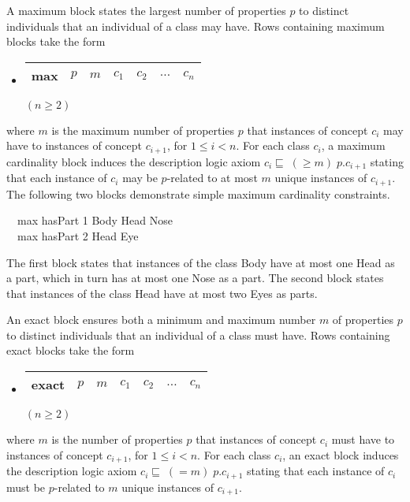 \documentclass[preprint,number]{elsarticle}
\begin{document}
A maximum block states the largest number of properties $p$ to
distinct individuals that an individual of a class may have.  Rows
containing maximum blocks take the form
\begin{itemize}
\item[]
  \begin{tabular}{|l|l|l|l|l|l|l|}\hline \textsf{max} & $p$ & $m$ & 
    $c_1$ & $c_2$ & $\dots$ & $c_n$
    \\ \hline
  \end{tabular} \hfill $(n \ge 2)$
\end{itemize}
where $m$ is the maximum number of properties $p$ that instances of
concept $c_i$ may have to instances of concept $c_{i+1}$, for $1 \le i
< n$.  For each class $c_i$, a maximum cardinality block induces the
description logic axiom $c_i \sqsubseteq \; (\ge m) \; p.c_{i+1}$
stating that each instance of $c_i$ may be $p$-related to at most $m$
unique instances of $c_{i+1}$. The following two blocks demonstrate
simple maximum cardinality constraints.
\begin{tabbing}
  ~~\textsf{max} \textsf{hasPart} 1 \textsf{Body} \textsf{Head} 
  \textsf{Nose} \\
  ~~\textsf{max} \textsf{hasPart} 2 \textsf{Head} \textsf{Eye}
\end{tabbing}
The first block states that instances of the class Body have at most
one Head as a part, which in turn has at most one Nose as a part. The
second block states that instances of the class Head have at most two
Eyes as parts. 

An exact block ensures both a minimum and maximum number $m$ of
properties $p$ to distinct individuals that an individual of a class
must have. Rows containing exact blocks take the form
\begin{itemize}
\item[]
  \begin{tabular}{|l|l|l|l|l|l|l|}\hline \textsf{exact} & $p$ & $m$ & 
    $c_1$ & $c_2$ & $\dots$ & $c_n$
    \\ \hline
  \end{tabular} \hfill $(n \ge 2)$
\end{itemize}
where $m$ is the number of properties $p$ that instances of concept
$c_i$ must have to instances of concept $c_{i+1}$, for $1 \le i < n$.
For each class $c_i$, an exact block induces the description logic
axiom $c_i \sqsubseteq \; (= m) \; p.c_{i+1}$ stating that each
instance of $c_i$ must be $p$-related to $m$ unique instances of
$c_{i+1}$.
\end{document}
